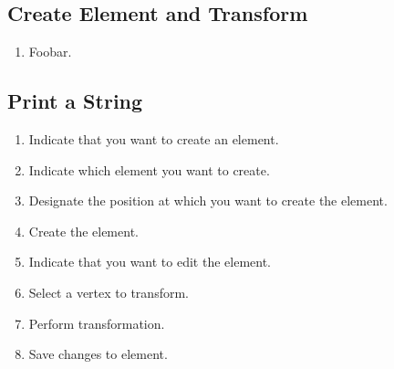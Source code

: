 \subsection{Create Element and Transform}
\label{app:euc_create_transform}

\begin{enumerate}
  \item Foobar. %
\end{enumerate}

\subsection{Print a String}
\label{app:euc_print_string}

\begin{enumerate}
  \item Indicate that you want to create an element.
  \item Indicate which element you want to create.
  \item Designate the position at which you want to create the element.
  \item Create the element.
  \item Indicate that you want to edit the element.
  \item Select a vertex to transform.
  \item Perform transformation.
  \item Save changes to element.
\end{enumerate}
